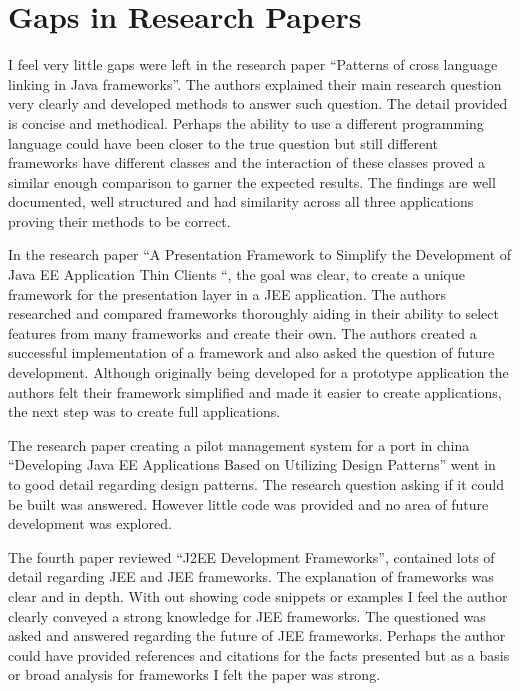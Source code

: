 														
														\section{Gaps in Research Papers}
														I feel very little gaps were left in the research paper “Patterns of cross language linking in Java frameworks”. The authors explained their main research question very clearly and developed methods to answer such question. The detail provided is concise and methodical. Perhaps the ability to use a different programming language could have been closer to the true question but still different frameworks have different classes and the interaction of these classes proved a similar enough comparison to garner the expected results. The findings are well documented, well structured and had similarity across all three applications proving their methods to be correct.
														
														In the research paper “A Presentation Framework to Simplify the Development of Java EE Application Thin Clients “, the goal was clear, to create a unique framework for the presentation layer in a JEE application. The authors researched and compared frameworks thoroughly aiding in their ability to select features from many frameworks and create their own. The authors created a successful implementation of a framework and also asked the question of future development. Although originally being developed for a prototype application the authors felt their framework simplified and made it easier to create applications, the next step was to create full applications. 
														
														The research paper creating a pilot management system for a port in china “Developing Java EE Applications Based on Utilizing Design Patterns” went in to good detail regarding design patterns. The research question asking if it could be built was answered. However little code was provided and no area of future development was explored.
														
														The fourth paper reviewed “J2EE Development Frameworks”, contained lots of detail regarding JEE and JEE frameworks. The explanation of frameworks was clear and in depth. With out showing code snippets or examples I feel the author clearly conveyed a strong knowledge for JEE frameworks. The questioned was asked and answered regarding the future of JEE frameworks. Perhaps the author could have provided references and citations for the facts presented but as a basis or broad analysis for frameworks I felt the paper was strong.
														
